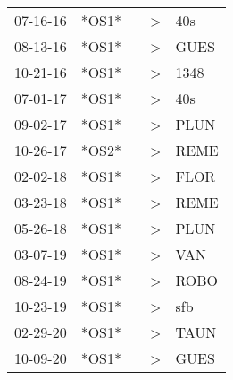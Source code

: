\begin{supertabular}{lllll}
 07-16-16 &  *OS1* &    &     \textgreater &   40s \\
 08-13-16 &  *OS1* &    &     \textgreater &  GUES \\
 10-21-16 &  *OS1* &    &     \textgreater &  1348 \\
 07-01-17 &  *OS1* &    &     \textgreater &   40s \\
 09-02-17 &  *OS1* &    &     \textgreater &  PLUN \\
 10-26-17 &  *OS2* &    &     \textgreater &  REME \\
 02-02-18 &  *OS1* &    &     \textgreater &  FLOR \\
 03-23-18 &  *OS1* &    &     \textgreater &  REME \\
 05-26-18 &  *OS1* &    &     \textgreater &  PLUN \\
 03-07-19 &  *OS1* &    &     \textgreater &   VAN \\
 08-24-19 &  *OS1* &    &     \textgreater &  ROBO \\
 10-23-19 &  *OS1* &    &     \textgreater &   sfb \\
 02-29-20 &  *OS1* &    &     \textgreater &  TAUN \\
 10-09-20 &  *OS1* &    &     \textgreater &  GUES \\
\end{supertabular}
